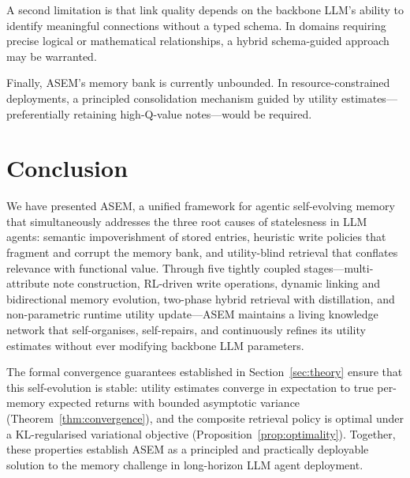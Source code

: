 \documentclass{article}
\newcommand{\ours}{\textsc{ASEM}\xspace}
\begin{document}
A second limitation is that link quality depends on the backbone LLM's ability
to identify meaningful connections without a typed schema.
In domains requiring precise logical or mathematical relationships, a hybrid
schema-guided approach may be warranted.

Finally, \ours's memory bank is currently unbounded.
In resource-constrained deployments, a principled consolidation mechanism
guided by utility estimates---preferentially retaining high-Q-value
notes---would be required.


\section{Conclusion}
\label{sec:conclusion}

We have presented \ours, a unified framework for agentic self-evolving memory
that simultaneously addresses the three root causes of statelesness in LLM
agents: semantic impoverishment of stored entries, heuristic write policies
that fragment and corrupt the memory bank, and utility-blind retrieval that
conflates relevance with functional value.
Through five tightly coupled stages---multi-attribute note construction,
RL-driven write operations, dynamic linking and bidirectional memory evolution,
two-phase hybrid retrieval with distillation, and non-parametric runtime
utility update---\ours maintains a living knowledge network that
self-organises, self-repairs, and continuously refines its utility estimates
without ever modifying backbone LLM parameters.

The formal convergence guarantees established in Section~\ref{sec:theory}
ensure that this self-evolution is stable: utility estimates converge in
expectation to true per-memory expected returns with bounded asymptotic
variance (Theorem~\ref{thm:convergence}), and the composite retrieval policy
is optimal under a KL-regularised variational objective
(Proposition~\ref{prop:optimality}).
Together, these properties establish \ours as a principled and practically
deployable solution to the memory challenge in long-horizon LLM agent
deployment.




\end{document}
